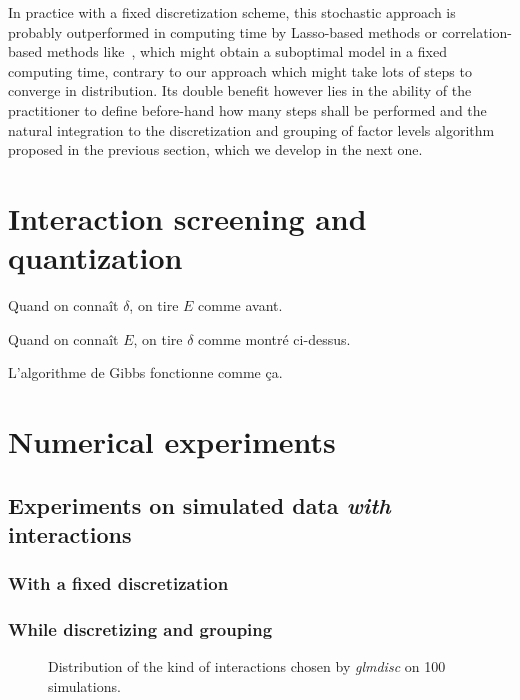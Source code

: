 In practice with a fixed discretization scheme, this stochastic approach is probably outperformed in computing time by Lasso-based methods or correlation-based methods like~\cite{simon}, which might obtain a suboptimal model in a fixed computing time, contrary to our approach which might take lots of steps to converge in distribution. Its double benefit however lies in the ability of the practitioner to define before-hand how many steps shall be performed and the natural integration to the discretization and grouping of factor levels algorithm proposed in the previous section, which we develop in the next one.

\section{Interaction screening and quantization}

Quand on connaît $\delta$, on tire $E$ comme avant.

Quand on connaît $E$, on tire $\delta$ comme montré ci-dessus.

L'algorithme de Gibbs fonctionne comme ça.



\section{Numerical experiments}


\subsection{Experiments on simulated data \textit{with} interactions}

\subsubsection{With a fixed discretization}





\subsubsection{While discretizing and grouping}

\begin{figure}
\centering
\resizebox{\linewidth}{6cm}{%

}
\caption{\label{fig:simulated_interaction}Distribution of the kind of interactions chosen by \textit{glmdisc} on 100 simulations.}
\end{figure}




